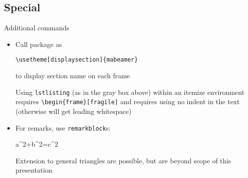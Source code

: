 \documentclass{beamer}
\begin{document}
\subsection{Special}

\begin{frame}[fragile]{Additional commands}
\begin{itemize}
	\item Call package  as
	\begin{lstlisting}
\usetheme[displaysection]{mabeamer}
	\end{lstlisting}
	to display section name on each frame
	\begin{alertblock}[\bigexclaim]
		Using \texttt{lstlisting} (as in the gray box above) within an itemize environment requires 
		 \texttt{\textbackslash begin\{frame\}[fragile]} and requires using no indent in the text (otherwise will get leading whitespace)
	\end{alertblock}
	
	\item For remarks, 	use \texttt{remarkblock}s:
	\begin{equationblock}[Pythagoras]
		a^2+b^2=c^2
	\end{equationblock}
	\begin{remarkblock}
		\centering Extension to general triangles are possible, but are beyond scope of this presentation
	\end{remarkblock}
\end{itemize}
\end{frame}
\end{document}
